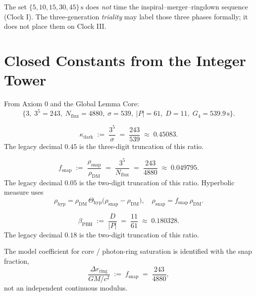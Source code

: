 \begin{corollary}
\label{cor:subharm}
The set \(\{5,10,15,30,45\}\,\mathrm{s}\) does \emph{not} time the
inspiral--merger--ringdown sequence (Clock I). The three-generation
\emph{triality} may label those three phases formally; it does not place them
on Clock III.
\end{corollary}

\section{Closed Constants from the Integer Tower}
\label{sec:closed-constants}

\begin{definition}
\label{def:tower}
From Axiom 0 and the Global Lemma Core:
\[
\bigl\{
3,\;
3^5=243,\;
N_{\mathrm{flux}}=4880,\;
\sigma=539,\;
|P|=61,\;
D=11,\;
G_4=539.9\,\mathrm{s}
\bigr\}.
\]
\end{definition}

\begin{definition}
\label{def:kappa}
\[
\kappa_{\mathrm{dark}}
\;:=\;
\frac{3^5}{\sigma}
\;=\;
\frac{243}{539}
\;\approx\; 0.45083.
\]
The legacy decimal \(0.45\) is the three-digit truncation of this ratio.
\end{definition}

\begin{definition}
\label{def:snap}
\[
f_{\mathrm{snap}}
\;:=\;
\frac{\rho_{\mathrm{snap}}}{\rho_{\mathrm{DM}}}
\;=\;
\frac{3^5}{N_{\mathrm{flux}}}
\;=\;
\frac{243}{4880}
\;\approx\; 0.049795.
\]
The legacy decimal \(0.05\) is the two-digit truncation of this ratio.
Hyperbolic measure uses
\[
\rho_{\mathrm{hyp}}
= \rho_{\mathrm{DM}}\,
\Theta_{\mathrm{hyp}}\!\bigl(\rho_{\mathrm{snap}}-\rho_{\mathrm{DM}}\bigr),
\quad
\rho_{\mathrm{snap}}=f_{\mathrm{snap}}\,\rho_{\mathrm{DM}}.
\]
\end{definition}

\begin{definition}
\label{def:beta}
\[
\beta_{\mathrm{PBH}}
\;:=\;
\frac{D}{|P|}
\;=\;
\frac{11}{61}
\;\approx\; 0.180328.
\]
The legacy decimal \(0.18\) is the two-digit truncation of this ratio.
\end{definition}

\begin{lemma}
\label{lem:ring}
The model coefficient for core / photon-ring saturation is identified with the
snap fraction,
\begin{equation}
\label{eq:ring}
\frac{\Delta r_{\mathrm{ring}}}{GM/c^2}
\;:=\;
f_{\mathrm{snap}}
\;=\;
\frac{243}{4880},
\end{equation}
not an independent continuous modulus.
\end{lemma}

